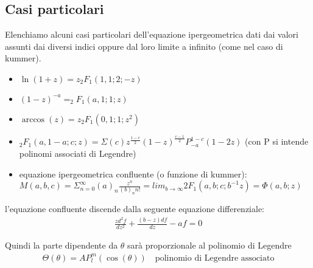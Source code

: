 \subsection{Casi particolari} %
Elenchiamo alcuni casi particolari dell'equazione ipergeometrica dati dai valori assunti dai diversi indici oppure dal loro limite a infinito (come nel caso di kummer).
\begin{itemize}
\item $\ln{\left(1+z\right)}=z_2F_1\left(1,1;2;-z\right)$
\item $\left(1-z\right)^{-a}= _2F_1\left(a,1;1;z\right)$
\item $\arccos{\left(z\right)}=z _2F_1\left(0,1;1;z^2\right)$
\item $_2F_1\left(a,1-a;c;z\right)=\Sigma\left(c\right)z^{\frac{1-c}{2}}\left(1-z\right)^{\frac{c-1}{2}}P_{-a}^{1-c}\left(1-2z\right)$ (con P si intende polinomi associati di Legendre)
\item equazione ipergeometrica confluente (o funzione di kummer): $M\left(a,b,c\right)=\Sigma_{n=0}^\infty(a)_n\frac{z^n}{(b)_nn!}=lim_{b\rightarrow\infty}{2F_1\left(a,b;c;b^{-1}z\right)}=\Phi(a,b;z)$
\end{itemize}
l'equazione confluente discende dalla seguente equazione differenziale:
\begin{equation}\begin{split}
\frac{zd^2f}{dz^2}+\frac{(b-z)df}{dz}-af=0
\end{split}\end{equation}

Quindi la parte dipendente da $\theta$ sarà proporzionale al polinomio di Legendre 
\begin{equation}\begin{split}
\Theta\left(\theta\right)=AP_l^m\left(\cos{\left(\theta\right)}\right) \quad \textrm{polinomio di Legendre associato}
\end{split}\end{equation}

